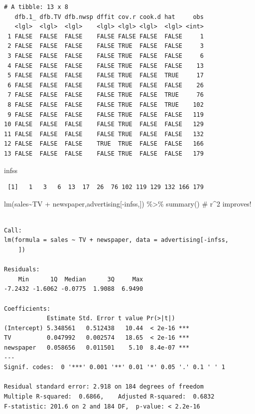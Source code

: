 \documentclass[
  letterpaper,
  DIV=11,
  numbers=noendperiod]{scrreprt}
\newenvironment{Shaded}{\begin{snugshade}}{\end{snugshade}}
\newcommand{\CommentTok}[1]{\textcolor[rgb]{0.41,0.41,0.41}{#1}}
\newcommand{\FunctionTok}[1]{\textcolor[rgb]{0.02,0.16,0.49}{#1}}
\newcommand{\NormalTok}[1]{\textcolor[rgb]{0.33,0.33,0.33}{#1}}
\newcommand{\SpecialCharTok}[1]{\textcolor[rgb]{0.00,0.46,0.62}{#1}}
\begin{document}
\begin{verbatim}
# A tibble: 13 x 8
   dfb.1_ dfb.TV dfb.nwsp dffit cov.r cook.d hat     obs
   <lgl>  <lgl>  <lgl>    <lgl> <lgl> <lgl>  <lgl> <int>
 1 FALSE  FALSE  FALSE    FALSE FALSE FALSE  FALSE     1
 2 FALSE  FALSE  FALSE    FALSE TRUE  FALSE  FALSE     3
 3 FALSE  FALSE  FALSE    FALSE TRUE  FALSE  FALSE     6
 4 FALSE  FALSE  FALSE    FALSE TRUE  FALSE  FALSE    13
 5 FALSE  FALSE  FALSE    FALSE TRUE  FALSE  TRUE     17
 6 FALSE  FALSE  FALSE    FALSE TRUE  FALSE  FALSE    26
 7 FALSE  FALSE  FALSE    FALSE TRUE  FALSE  TRUE     76
 8 FALSE  FALSE  FALSE    FALSE TRUE  FALSE  TRUE    102
 9 FALSE  FALSE  FALSE    FALSE TRUE  FALSE  FALSE   119
10 FALSE  FALSE  FALSE    FALSE TRUE  FALSE  FALSE   129
11 FALSE  FALSE  FALSE    FALSE TRUE  FALSE  FALSE   132
12 FALSE  FALSE  FALSE    TRUE  TRUE  FALSE  FALSE   166
13 FALSE  FALSE  FALSE    FALSE TRUE  FALSE  FALSE   179
\end{verbatim}

\begin{Shaded}
\begin{Highlighting}[]
\NormalTok{infss}
\end{Highlighting}
\end{Shaded}

\begin{verbatim}
 [1]   1   3   6  13  17  26  76 102 119 129 132 166 179
\end{verbatim}

\begin{Shaded}
\begin{Highlighting}[]
\FunctionTok{lm}\NormalTok{(sales}\SpecialCharTok{\textasciitilde{}}\NormalTok{TV }\SpecialCharTok{+}\NormalTok{ newspaper,advertising[}\SpecialCharTok{{-}}\NormalTok{infss,]) }\SpecialCharTok{\%\textgreater{}\%} \FunctionTok{summary}\NormalTok{() }\CommentTok{\# r\^{}2 improves!}
\end{Highlighting}
\end{Shaded}

\begin{verbatim}

Call:
lm(formula = sales ~ TV + newspaper, data = advertising[-infss, 
    ])

Residuals:
    Min      1Q  Median      3Q     Max 
-7.2432 -1.6062 -0.0775  1.9088  6.9490 

Coefficients:
            Estimate Std. Error t value Pr(>|t|)    
(Intercept) 5.348561   0.512438   10.44  < 2e-16 ***
TV          0.047992   0.002574   18.65  < 2e-16 ***
newspaper   0.058656   0.011501    5.10  8.4e-07 ***
---
Signif. codes:  0 '***' 0.001 '**' 0.01 '*' 0.05 '.' 0.1 ' ' 1

Residual standard error: 2.918 on 184 degrees of freedom
Multiple R-squared:  0.6866,    Adjusted R-squared:  0.6832 
F-statistic: 201.6 on 2 and 184 DF,  p-value: < 2.2e-16
\end{verbatim}
\end{document}
